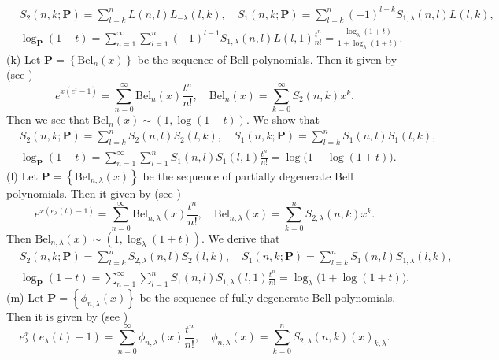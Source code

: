 \documentclass[a4paper,11pt]{amsart}
\begin{document}
\begin{align*} 
&S_{2}(n,k;\mathbf{P})=\sum_{l=k}^{n}L(n,l)L_{-\lambda}(l,k), \quad S_{1}(n,k;\mathbf{P})=\sum_{l=k}^{n}(-1)^{l-k}S_{1,\lambda}(n,l)L(l,k), \\
&\log_{\mathbf{P}}(1+t)=\sum_{n=1}^{\infty}\sum_{l=1}^{n}(-1)^{l-1}S_{1,\lambda}(n,l)L(l,1)\frac{t^{n}}{n!}=\frac{\log_{\lambda}(1+t)}{1+\log_{\lambda}(1+t)}.
\end{align*}
(k)  Let $\mathbf{P}=\left\{\mathrm{Bel}_{n}(x)\right\}$ be the sequence of Bell polynomials. Then it given by (see \cite{5,24,25})
\begin{equation*}
e^{x(e^{t}-1)}=\sum_{n=0}^{\infty}\mathrm{Bel}_{n}(x)\frac{t^{n}}{n!},\quad \mathrm{Bel}_{n}(x)=\sum_{k=0}^{\infty}S_{2}(n,k)x^{k}.  
\end{equation*}
Then we see that $\mathrm{Bel}_{n}(x) \sim (1, \log (1+t))$. We show that
\begin{align*}
&S_{2}(n,k;\mathbf{P})=\sum_{l=k}^{n}S_2(n,l)S_{2}(l,k), \quad S_{1}(n,k;\mathbf{P})=\sum_{l=k}^{n}S_{1}(n,l)S_{1}(l,k), \\
&\log_{\mathbf{P}}(1+t)=\sum_{n=1}^{\infty} \sum_{l=1}^{n}S_{1}(n,l)S_{1}(l,1)\frac{t^{n}}{n!}=\log \big(1+\log(1+t)\big).
\end{align*}
(l) Let $\mathbf{P}=\left\{\mathrm{Bel}_{n,\lambda}(x)\right\}$ be the sequence of partially degenerate Bell polynomials. Then it given by (see \cite{18})
\begin{equation*}
e^{x(e_{\lambda}(t)-1)}=\sum_{n=0}^{\infty}\mathrm{Bel}_{n,\lambda}(x)\frac{t^{n}}{n!}, \quad \mathrm{Bel}_{n,\lambda}(x)=\sum_{k=0}^{n}S_{2,\lambda}(n,k)x^{k}.
\end{equation*}
Then $\mathrm{Bel}_{n,\lambda}(x) \sim (1, \log_{\lambda}(1+t))$. We derive that
\begin{align*}
&S_{2}(n,k;\mathbf{P})=\sum_{l=k}^{n}S_{2,\lambda}(n,l)S_{2}(l,k), \quad S_{1}(n,k;\mathbf{P})=\sum_{l=k}^{n}S_{1}(n,l)S_{1,\lambda}(l,k), \\
&\log_{\mathbf{P}}(1+t)=\sum_{n=1}^{\infty} \sum_{l=1}^{n}S_{1}(n,l)S_{1,\lambda}(l,1)\frac{t^{n}}{n!}=\log_{\lambda}\big(1+\log(1+t)\big).
\end{align*}
(m) Let $\mathbf{P}=\left\{\phi_{n,\lambda}(x)\right\}$ be the sequence of fully degenerate Bell polynomials. Then it is given by (see \cite{19})
\begin{equation*}
e_{\lambda}^{x}(e_{\lambda}(t)-1)=\sum_{n=0}^{\infty}\phi_{n,\lambda}(x)\frac{t^{n}}{n!}, \quad \phi_{n,\lambda}(x)=\sum_{k=0}^{n}S_{2,\lambda}(n,k)(x)_{k,\lambda}.
\end{equation*}
\end{document}
